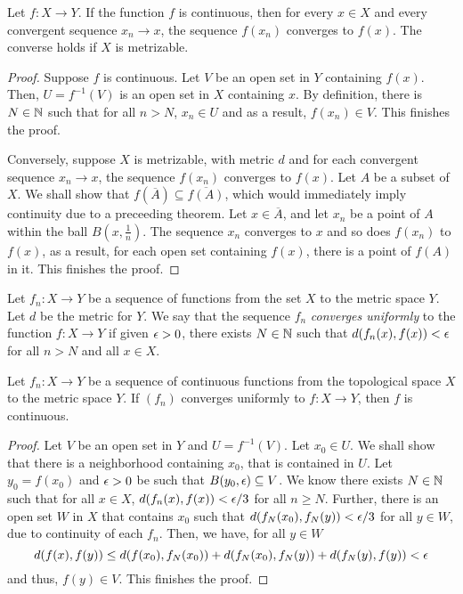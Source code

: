 \begin{theorem}
    Let $f:X\to Y$. If the function $f$ is continuous, then for every $x\in X$ and every convergent sequence $x_n\to x$, the sequence $f(x_n)$ converges to $f(x)$. The converse holds if $X$ is metrizable.
\end{theorem}
\begin{proof}
    Suppose $f$ is continuous. Let $V$ be an open set in $Y$ containing $f(x)$. Then, $U = f^{-1}(V)$ is an open set in $X$ containing $x$. By definition, there is $N\in\mathbb{N}$ such that for all $n > N$, $x_n\in U$ and as a result, $f(x_n)\in V$. This finishes the proof.

    Conversely, suppose $X$ is metrizable, with metric $d$ and for each convergent sequence $x_n\to x$, the sequence $f(x_n)$ converges to $f(x)$. Let $A$ be a subset of $X$. We shall show that $f(\overline{A})\subseteq\overline{f(A)}$, which would immediately imply continuity due to a preceeding theorem. Let $x\in\overline{A}$, and let $x_n$ be a point of $A$ within the ball $B(x,\frac{1}{n})$. The sequence $x_n$ converges to $x$ and so does $f(x_n)$ to $f(x)$, as a result, for each open set containing $f(x)$, there is a point of $f(A)$ in it. This finishes the proof.
\end{proof}

\begin{definition}
    Let $f_n:X\to Y$ be a sequence of functions from the set $X$ to the metric space $Y$. Let $d$ be the metric for $Y$. We say that the sequence $f_n$ \textit{converges uniformly} to the function $f:X\to Y$ if given $\epsilon > 0$, there exists $N\in\mathbb{N}$ such that $d(f_n(x), f(x)) < \epsilon$ for all $n > N$ and all $x\in X$.
\end{definition}

\begin{theorem}
    Let $f_n:X\to Y$ be a sequence of continuous functions from the topological space $X$ to the metric space $Y$. If $(f_n)$ converges uniformly to $f:X\to Y$, then $f$ is continuous.
\end{theorem}
\begin{proof}
    Let $V$ be an open set in $Y$ and $U = f^{-1}(V)$. Let $x_0\in U$. We shall show that there is a neighborhood containing $x_0$, that is contained in $U$. Let $y_0 = f(x_0)$ and $\epsilon > 0$ be such that $B(y_0,\epsilon)\subseteq V$. We know there exists $N\in\mathbb{N}$ such that for all $x\in X$, $d(f_n(x), f(x)) < \epsilon/3$ for all $n\ge N$. Further, there is an open set $W$ in $X$ that contains $x_0$ such that $d(f_N(x_0), f_N(y)) < \epsilon/3$ for all $y\in W$, due to continuity of each $f_n$. Then, we have, for all $y\in W$
    \begin{equation*}
        d(f(x), f(y))\le d(f(x_0), f_N(x_0)) + d(f_N(x_0), f_N(y)) + d(f_N(y), f(y)) < \epsilon
    \end{equation*}
    and thus, $f(y)\in V$. This finishes the proof.
\end{proof}

